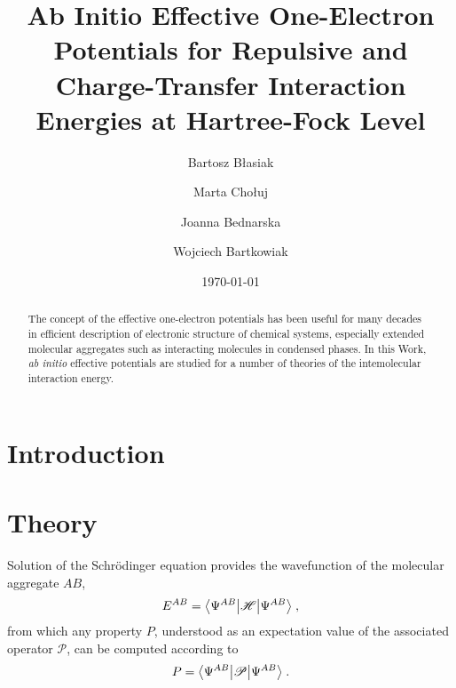 


\title{Ab Initio Effective One-Electron Potentials 
for Repulsive and Charge-Transfer Interaction Energies at Hartree-Fock Level}

\author{Bartosz B{\l}asiak}

\author{Marta Cho{\l}uj} 
\author{Joanna Bednarska}
\author{Wojciech Bartkowiak}


\date{\today}

\begin{abstract}
The concept of the effective one-electron potentials has been useful for many decades
in efficient description of electronic structure of chemical systems, especially extended
molecular aggregates such as interacting molecules in condensed phases. 
In this Work, \emph{ab initio} effective potentials are studied for a number of theories
of the intemolecular interaction energy.
\end{abstract}

\pacs{}

\maketitle

\tableofcontents

\section{\label{s:1}Introduction}
\section{\label{s:2}Theory}

Solution of the Schr{\"o}dinger equation provides the wavefunction
of the molecular aggregate $AB$,
%
\begin{equation}
 E^{AB} = \bigl\langle {\Psi^{AB}} \bigl\lvert {\mathscr{H}} \bigl\lvert {\Psi^{AB}} \bigr\rangle \;,
\end{equation}
%
from which any property $P$, understood as an expectation value of the
associated operator $\mathscr{P}$, can be computed according to
%
\begin{equation}
 P = \bigl\langle {\Psi^{AB}} \bigl\lvert {\mathscr{P}} \bigl\lvert {\Psi^{AB}} \bigr\rangle \;.
\end{equation}
%


